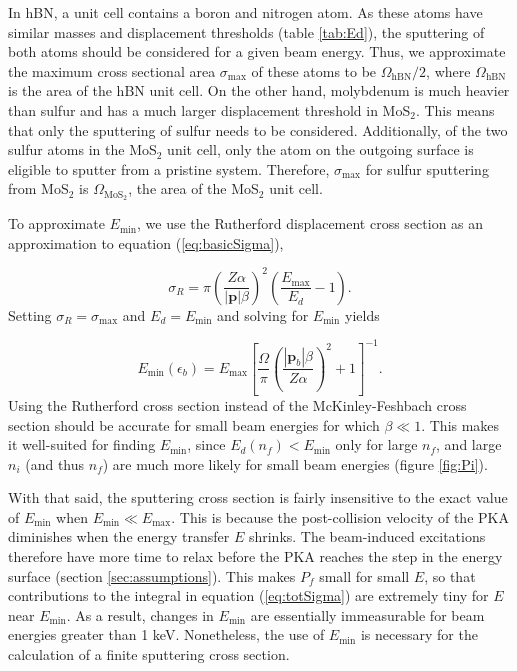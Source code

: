\documentclass{article}
\begin{document}
In hBN, a unit cell contains a boron and nitrogen atom.
As these atoms have similar masses and displacement thresholds (table
\ref{tab:Ed}), the sputtering of both atoms should be considered for a given
beam energy.
Thus, we approximate the maximum cross sectional area $\sigma_\text{max}$ of
these atoms to be $\Omega_\text{hBN}/2$, where $\Omega_\text{hBN}$ is the area
of the hBN unit cell.
On the other hand, molybdenum is much heavier than sulfur and has a much larger
displacement threshold in MoS$_2$.\cite{Komsa2012}  
This means that only the sputtering of sulfur needs to be considered.
Additionally, of the two sulfur atoms in the MoS$_2$ unit cell, only the atom
on the outgoing surface is eligible to sputter from a pristine system.
\cite{Komsa2012}
Therefore, $\sigma_\text{max}$ for sulfur sputtering from MoS$_2$ is
$\Omega_\text{MoS$_2$}$, the area of the MoS$_2$ unit cell.

To approximate $E_\text{min}$, we use the Rutherford displacement cross section
\cite{Thornton2004, Sakurai2011, Yoshimura2018} as an approximation to equation
(\ref{eq:basicSigma}),

\begin{equation}
  \sigma_R
  =
  \pi\left(\frac{Z\alpha}{|\mathbf{p}|\beta}\right)^2
  \left(\frac{E_\text{max}}{E_d} - 1\right).
  \label{eq:Rutherford}
\end{equation}
%
Setting $\sigma_R=\sigma_\text{max}$ and $E_d=E_\text{min}$ and solving for
$E_\text{min}$ yields

\begin{equation}
  E_\text{min}(\epsilon_b)
  =
  E_\text{max}
  \left[\frac{\Omega}{\pi}
    \left(\frac{|\mathbf{p}_b|\beta}{Z\alpha}\right)^2 + 1
  \right]^{-1}.
  \label{eq:Emin}
\end{equation}
%
Using the Rutherford cross section instead of the McKinley-Feshbach cross
section should be accurate for small beam energies for which $\beta\ll 1$.
This makes it well-suited for finding $E_\text{min}$, since
$E_d(n_f)<E_\text{min}$ only for large $n_f$, and large $n_i$ (and thus $n_f$)
are much more likely for small beam energies (figure \ref{fig:Pi}).

With that said, the sputtering cross section is fairly insensitive to the exact
value of $E_\text{min}$ when $E_\text{min} \ll E_\text{max}$.
This is because the post-collision velocity of the PKA diminishes when the
energy transfer $E$ shrinks.
The beam-induced excitations therefore have more time to relax before the PKA
reaches the step in the energy surface (section \ref{sec:assumptions}).
This makes $P_f$ small for small $E$, so that contributions to the integral in
equation (\ref{eq:totSigma}) are extremely tiny for $E$ near $E_\text{min}$.
As a result, changes in $E_\text{min}$ are essentially immeasurable for beam
energies greater than 1 keV.
Nonetheless, the use of $E_\text{min}$ is necessary for the calculation of a
finite sputtering cross section.



\end{document}
